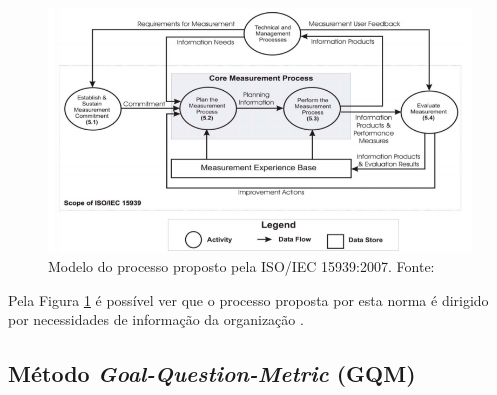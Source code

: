       \begin{figure}[!htb]
	\centering
	\includegraphics[scale=0.45]{figuras/iso15939}
	\caption[Modelo do processo proposto pela ISO/IEC 15939:2007.]
		{Modelo do processo proposto pela ISO/IEC 15939:2007. Fonte: \cite{iso15939}}
	\label{iso15939_model}
      \end{figure}
      
      Pela Figura \ref{iso15939_model} é possível ver que o processo proposta por esta norma é dirigido por
      necessidades de informação da organização \cite{iso15939}.

  \subsection{Método \textit{Goal-Question-Metric} (GQM)}

